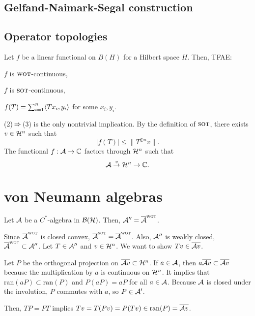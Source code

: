 \documentclass{../exp}
\newcommand{\wot}{{\text{\sc wot}}}
\newcommand{\sot}{{\text{\sc sot}}}
\newcommand{\ran}{\mathrm{ran}}
\begin{document}
\subsection{Gelfand-Naimark-Segal construction}


\subsection{Operator topologies}

\begin{thm}
Let $f$ be a linear functional on $B(H)$ for a Hilbert space $H$.
Then, TFAE:
\begin{cond}
\item $f$ is $\wot$-continuous,
\item $f$ is $\sot$-continuous,
\item $f(T)=\sum_{i=1}^n\langle Tx_i,y_i\rangle$ for some $x_i,y_i$.
\end{cond}
\end{thm}
\begin{pf}
(2)$\impl$(3) is the only nontrivial implication.
By the definition of $\sot$, there exists $v\in \mathcal{H}^n$ such that
\[|f(T)|\le\|T^{\oplus n}v\|.\]
The functional $f:\cA\to\C$ factors through $\mathcal{H}^n$ such that
\[\cA\to{v}\cH^n\to\C.\]
\end{pf}




\section{von Neumann algebras}

\begin{thm}
Let $\mathcal{A}$ be a $C^*$-algebra in $\mathcal{B}(\mathcal{H})$.
Then, $\cA''=\cl\cA^\wot$.
\end{thm}
\begin{pf}
Since $\cl\cA^\wot$ is closed convex, $\cl\cA^\sot=\cl\cA^\wot$.
Also, $\mathcal{A}''$ is weakly closed, $\cl\cA^\wot\subset\cA''$.
Let $T\in\mathcal{A}''$ and $v\in\mathcal{H}^n$.
We want to show $Tv\in\overline{\mathcal{A} v}$.

Let $P$ be the orthogonal projection on $\overline{\mathcal{A} v}\subset\mathcal{H}^n$.
If $a\in\mathcal{A}$, then $a\overline{\mathcal{A} v}\subset\overline{\mathcal{A} v}$ because the multiplication by $a$ is continuous on $\mathcal{H}^n$.
It implies that $\ran(aP)\subset\ran(P)$ and $P(aP)=aP$ for all $a\in\mathcal{A}$.
Because $\mathcal{A}$ is closed under the involution, $P$ commutes with $a$, so $P\in\mathcal{A}'$.

Then, $TP=PT$ implies $Tv=T(Pv)=P(Tv)\in\ran(P)=\cl{\cA v}$.

\end{pf}
\end{document}
